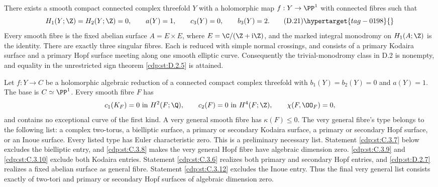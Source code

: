 \begin{proposition}\hypertarget{tag-01GE}{}\label{cdp:st:D.2.7}



There exists a smooth compact connected complex threefold $Y$
with a holomorphic map $f:Y\to\PP^1$ with connected fibres such
that
\[
 H_1(Y;\Z)=H_2(Y;\Z)=0,\qquad
 a(Y)=1,\qquad c_3(Y)=0,\qquad b_3(Y)=2.
\tag{D.21}\hypertarget{tag-0198}{}\label{cdp:eq:D.21}
\]
Every smooth fibre is the fixed abelian surface
$A=E\times E$, where $E=\C/(\Z+\mathrm i\Z)$, and the marked
integral monodromy on $H_1(A;\Z)$ is the identity. There are
exactly three singular fibres. Each is reduced with simple
normal crossings, and consists of a primary Kodaira surface
and a primary Hopf surface meeting along one smooth elliptic
curve. Consequently the trivial-monodromy class in D.2 is
nonempty, and equality in the unrestricted sign theorem
\ref{cdp:st:D.2.5} is attained.
\end{proposition}

\begin{proposition}\hypertarget{tag-01F4}{}\label{cdp:st:C.3.1}


Let $f:Y\to C$ be a holomorphic algebraic reduction of a connected
compact complex threefold with $b_1(Y)=b_2(Y)=0$ and $a(Y)=1$.
The base is $C\simeq\PP^1$. Every smooth fibre $F$ has
\[
 c_1(K_F)=0\text{ in }H^2(F;\Q),\qquad
 c_2(F)=0\text{ in }H^4(F;\Z),\qquad
 \chi(F,\OO_F)=0,
\]
and contains no exceptional curve of the first kind. A very general
smooth fibre has $\kappa(F)\leq0$. The very general fibre's type belongs to the following
list: a complex two-torus, a bielliptic surface, a primary or secondary
Kodaira surface, a primary or secondary Hopf surface, or an Inoue
surface. Every listed type has Euler characteristic zero. This is a
preliminary necessary list. Statement \ref{cdp:st:C.3.7} below excludes the
bielliptic entry, and \ref{cdp:st:C.3.8} makes the very general Hopf fibre have
algebraic dimension zero. \ref{cdp:st:C.3.9} and \ref{cdp:st:C.3.10} exclude both Kodaira
entries. Statement \ref{cdp:st:C.3.6} realizes both primary and secondary Hopf
entries, and \ref{cdp:st:D.2.7} realizes a fixed abelian surface as general
fibre. Statement \ref{cdp:st:C.3.12} excludes the Inoue entry. Thus the
final very general list consists exactly of two-tori and
primary or secondary Hopf surfaces of algebraic dimension zero.
\end{proposition}

